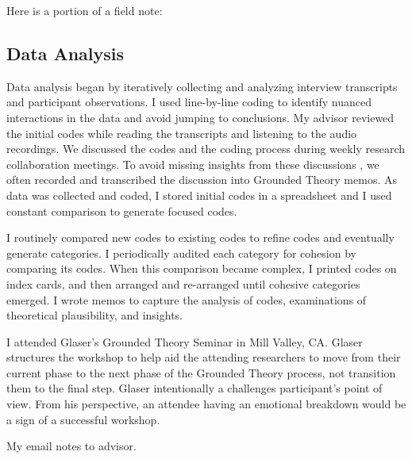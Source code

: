 Here is a portion of a field note: 
\subsection{Data Analysis}
Data analysis began by iteratively collecting and analyzing interview transcripts and participant observations. I used line-by-line coding \cite{Charmaz} to identify nuanced interactions in the data and avoid jumping to conclusions. My advisor reviewed the initial codes while reading the transcripts and listening to the audio recordings.  We discussed the codes and the coding process during weekly research collaboration meetings. To avoid missing insights from these discussions \cite{GlaserTheoreticalSensitivity}, we often recorded and transcribed the discussion into Grounded Theory memos. As data was collected and coded, I stored initial codes in a spreadsheet and I used constant comparison to generate focused codes.

I routinely compared new codes to existing codes to refine codes and eventually generate categories. I periodically audited each category for cohesion by comparing its codes. When this comparison became complex, I printed codes on index cards, and then arranged and re-arranged until cohesive categories emerged. I wrote memos to capture the analysis of codes, examinations of theoretical plausibility, and insights.

I attended Glaser’s Grounded Theory Seminar in Mill Valley, CA. Glaser structures the workshop to help aid the attending researchers to move from their current phase to the next phase of the Grounded Theory process, not transition them to the final step. Glaser intentionally a challenges participant’s point of view. From his perspective, an attendee having an emotional breakdown would be a sign of a successful workshop.


 \textemdash My email notes to advisor.

